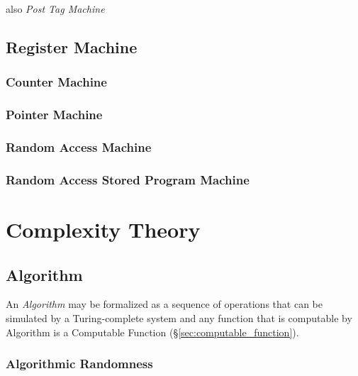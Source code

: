 \documentclass{article}
\begin{document}
also \emph{Post Tag Machine}

\subsection{Register Machine}\label{subsec:register_machine}

\subsubsection{Counter Machine}

\subsubsection{Pointer Machine}

\subsubsection{Random Access Machine}

\subsubsection{Random Access Stored Program Machine}



\section{Complexity Theory}\label{sec:complexity_theory}

\subsection{Algorithm}\label{subsec:algorithm}

An \emph{Algorithm} may be formalized as a sequence of operations that
can be simulated by a Turing-complete system and any function that is
computable by Algorithm is a Computable Function
(\S\ref{sec:computable_function}).

\subsubsection{Algorithmic Randomness}\label{subsec:algorithmic_randomness}
\end{document}
